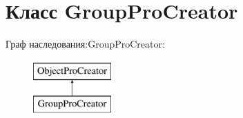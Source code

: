 \hypertarget{classGroupProCreator}{\section{Класс \-Group\-Pro\-Creator}
\label{classGroupProCreator}
}
Граф наследования\-:\-Group\-Pro\-Creator\-:\begin{figure}[H]
\begin{center}
\leavevmode
\includegraphics[height=2.000000cm]{classGroupProCreator}
\end{center}
\end{figure}
